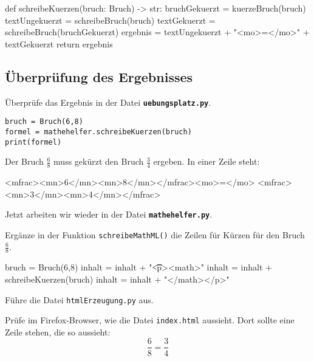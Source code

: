 \begin{codePython}
def schreibeKuerzen(bruch: Bruch) -> str:
	bruchGekuerzt = kuerzeBruch(bruch)
	textUngekuerzt = schreibeBruch(bruch)
	textGekuerzt = schreibeBruch(bruchGekuerzt)
	ergebnis = textUngekuerzt + "<mo>=</mo>" + textGekuerzt
	return ergebnis
\end{codePython}

\subsection*{Überprüfung des Ergebnisses}

Überprüfe das Ergebnis in der Datei \textbf{\texttt{uebungsplatz.py}}.

\lstset{style=syntaxPython}
\begin{lstlisting}
bruch = Bruch(6,8)
formel = mathehelfer.schreibeKuerzen(bruch)
print(formel)
\end{lstlisting}

Der Bruch $\frac{6}{8}$ muss gekürzt den Bruch $\frac{3}{4}$ ergeben. In einer Zeile steht:

\begin{codeHTML}
<mfrac><mn>6</mn><mn>8</mn></mfrac><mo>=</mo>
								<mfrac><mn>3</mn><mn>4</mn></mfrac>
\end{codeHTML}

Jetzt arbeiten wir wieder in der Datei \textbf{\texttt{mathehelfer.py}}.

Ergänze in der Funktion \texttt{schreibeMathML()} die Zeilen für Kürzen für den Bruch $\frac{6}{8}$.

\begin{codePython}
bruch = Bruch(6,8)
inhalt = inhalt + "\n\t\t<p><math>"
inhalt = inhalt + schreibeKuerzen(bruch)
inhalt = inhalt + "</math></p>"
\end{codePython}

Führe die Datei \texttt{htmlErzeugung.py} aus.

Prüfe im Firefox-Browser, wie die Datei \texttt{index.html} aussieht. Dort sollte eine Zeile stehen, die so aussieht:
\[
\frac{6}{8} = \frac{3}{4}
\]
